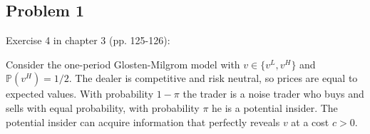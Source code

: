 \documentclass[11pt
, answers
]{exam}
\begin{document}
%
%	





\qquad
\subsection*{Problem 1}

Exercise 4 in chapter 3 (pp. 125-126):

Consider the one-period Glosten-Milgrom model with $v \in \{v^L, v^H\}$ and $\mathbb{P}(v^H)=1/2$. The dealer is competitive and risk neutral, so prices are equal to expected values. With probability $1-\pi$ the trader is a noise trader who buys and sells with equal probability, with probability $\pi$ he is a potential insider. The potential insider can acquire information that perfectly reveals $v$ at a cost $c>0$.
\end{document}
